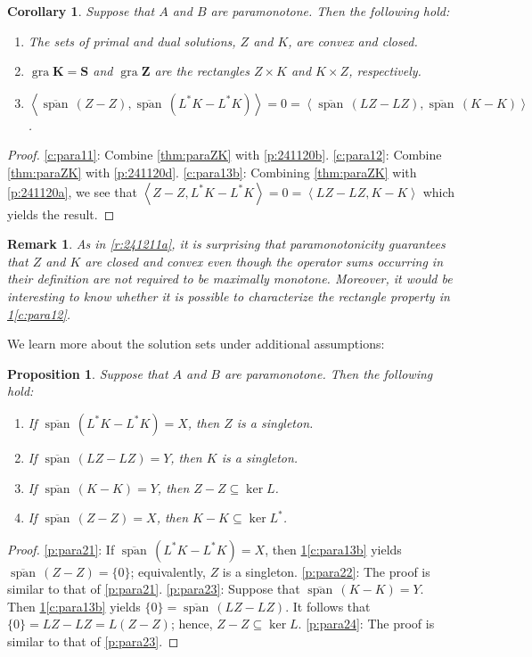 \documentclass{article}
\newcommand{\scal}[2]{\left\langle{#1},{#2}  \right\rangle}
\newcommand{\cspan}{\ensuremath{\overline{\operatorname{span}}\,}}
\newcommand{\bK}{\ensuremath{{\mathbf{K}}}}
\newcommand{\bKT}{\ensuremath{{\mathbf{S}}}}
\newcommand{\bZ}{\ensuremath{{\mathbf{Z}}}}
\newtheorem{corollary}[theorem]{Corollary}
\newtheorem{proposition}[theorem]{Proposition}
\newtheorem{remark}[theorem]{Remark}
\providecommand{\gr}{\operatorname{gra}}
\begin{document}
\begin{corollary}\label{c:para1}
Suppose that $A$ and $B$ are paramonotone. 
Then the following hold: 
\begin{enumerate}
\item\label{c:para11} The sets of primal and dual 
solutions, $Z$ and $K$, are convex and closed.
\item\label{c:para12} 
$\gr \bK = \bKT$ and $\gr \bZ$ are the rectangles $Z\times K$ and $K\times Z$, respectively.
\item\label{c:para13b} $\scal{\cspan(Z-Z)}{\cspan(L^*K-L^*K)}=0=\scal{\cspan(LZ-LZ)}{\cspan(K-K)}$.
\end{enumerate}
\end{corollary}

\begin{proof}
\cref{c:para11}: 
Combine  \cref{thm:paraZK} with \cref{p:241120b}. 
\cref{c:para12}: 
Combine \cref{thm:paraZK} 
with \cref{p:241120d}.
\cref{c:para13b}: 
Combining \cref{thm:paraZK} 
with \cref{p:241120a}, we see that 
$\scal{Z-Z}{L^*K-L^*K}=0=\scal{LZ-LZ}{K-K}$ which yields the result.
\end{proof}

\begin{remark}
As in \cref{r:241211a}, 
it is surprising that paramonotonicity guarantees that $Z$ and $K$ are 
closed and convex even though the operator sums occurring in their definition
are not required to be maximally monotone. 
{
Moreover, it would be interesting to know whether 
it is possible to characterize 
the rectangle property in 
\cref{c:para1}\cref{c:para12}. 
}
\end{remark}


We learn more about the solution sets under additional assumptions:

\begin{proposition}
\label{p:para2} 
Suppose that $A$ and $B$ are paramonotone.
Then the following hold: 
\begin{enumerate}
\item\label{p:para21} 
If $\cspan(L^*K-L^*K)=X$, then $Z$ is a singleton. 
\item\label{p:para22} 
If $\cspan(LZ-LZ)=Y$, then $K$ is a singleton.
\item\label{p:para23} 
If $\cspan(K-K)=Y$, then $Z-Z\subseteq \ker L$.
\item\label{p:para24} 
If $\cspan(Z-Z)=X$, then $K-K\subseteq \ker L^*$.
\end{enumerate}
\end{proposition}
\begin{proof}
\cref{p:para21}: 
If $\cspan(L^*K-L^*K)=X$, 
then \cref{c:para1}\cref{c:para13b} yields $\cspan(Z-Z)=\{0\}$; 
equivalently, $Z$ is a singleton. 
\cref{p:para22}: 
The proof is similar to that of \cref{p:para21}. 
\cref{p:para23}: 
Suppose that $\cspan(K-K)=Y$. 
Then \cref{c:para1}\cref{c:para13b} yields $\{0\}=\cspan(LZ-LZ)$. 
It follows that 
$\{0\} = LZ-LZ = L(Z-Z)$; hence, $Z-Z\subseteq\ker L$. 
\cref{p:para24}: 
The proof is similar to that of \cref{p:para23}. 
\end{proof}
\end{document}
